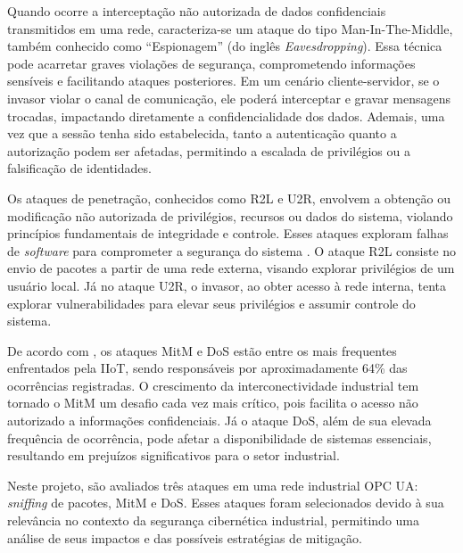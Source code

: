         Quando ocorre a interceptação não autorizada de dados confidenciais transmitidos em uma rede, caracteriza-se um ataque do tipo Man-In-The-Middle, também conhecido como ``Espionagem'' (do inglês \textit{Eavesdropping}). Essa técnica pode acarretar graves violações de segurança, comprometendo informações sensíveis e facilitando ataques posteriores. Em um cenário cliente-servidor, se o invasor violar o canal de comunicação, ele poderá interceptar e gravar mensagens trocadas, impactando diretamente a confidencialidade dos dados. Ademais, uma vez que a sessão tenha sido estabelecida, tanto a autenticação quanto a autorização podem ser afetadas, permitindo a escalada de privilégios ou a falsificação de identidades.

        Os ataques de penetração, conhecidos como R2L e U2R, envolvem a obtenção ou modificação não autorizada de privilégios, recursos ou dados do sistema, violando princípios fundamentais de integridade e controle. Esses ataques exploram falhas de \textit{software} para comprometer a segurança do sistema \cite{turcato2020}. O ataque R2L consiste no envio de pacotes a partir de uma rede externa, visando explorar privilégios de um usuário local. Já no ataque U2R, o invasor, ao obter acesso à rede interna, tenta explorar vulnerabilidades para elevar seus privilégios e assumir controle do sistema.


        De acordo com , os ataques MitM e DoS estão entre os mais frequentes enfrentados pela IIoT, sendo responsáveis por aproximadamente 64\% das ocorrências registradas. O crescimento da interconectividade industrial tem tornado o MitM um desafio cada vez mais crítico, pois facilita o acesso não autorizado a informações confidenciais. Já o ataque DoS, além de sua elevada frequência de ocorrência, pode afetar a disponibilidade de sistemas essenciais, resultando em prejuízos significativos para o setor industrial. 

        Neste projeto, são avaliados três ataques em uma rede industrial OPC UA: \textit{sniffing} de pacotes, MitM e DoS. Esses ataques foram selecionados devido à sua relevância no contexto da segurança cibernética industrial, permitindo uma análise de seus impactos e das possíveis estratégias de mitigação.

